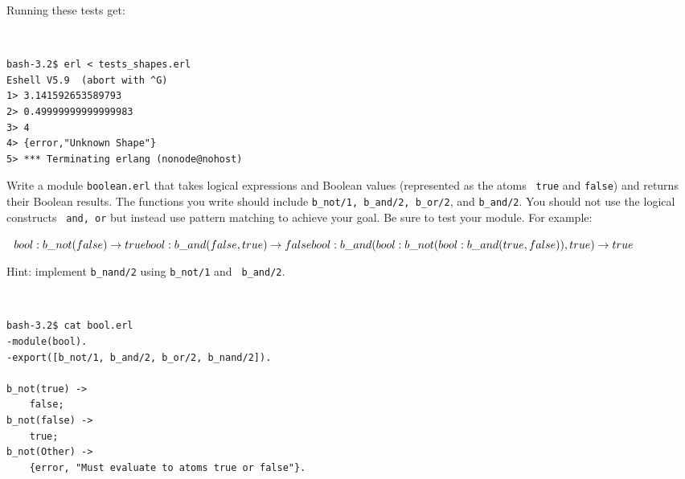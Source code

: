 \begin{questions}
\begin{solution}
    Running these tests get:
{\tt
\begin{verbatim}                                                                  
bash-3.2$ erl < tests_shapes.erl                                                  
Eshell V5.9  (abort with ^G)                                                      
1> 3.141592653589793                                                              
2> 0.49999999999999983                                                            
3> 4                                                                              
4> {error,"Unknown Shape"}                                                        
5> *** Terminating erlang (nonode@nohost)                                         
\end{verbatim}
}
    \end{solution}

    \question[15] Write a module {\tt boolean.erl} that takes logical
    expressions and Boolean values (represented as the atoms {\tt
    true} and {\tt false}) and returns their Boolean results. The
    functions you write should include {\tt b\_not/1, b\_and/2, b\_or/2},
    and {\tt b\_and/2}. You should not use the logical constructs {\tt
    and, or} but instead use pattern matching to achieve your goal. Be
    sure to test your module. For example:

    {\tt
    $bool:b\_not(false) \to true \\                                               
    bool:b\_and(false, true) \to false \\                                         
    bool:b\_and(bool:b\_not(bool:b\_and(true, false)), true) \to true \\          
    $}

    Hint: implement {\tt b\_nand/2} using {\tt b\_not/1} and {\tt
    b\_and/2}.

    \begin{solution}
    {\tt
\begin{verbatim}                                                                  
bash-3.2$ cat bool.erl                                                            
-module(bool).                                                                    
-export([b_not/1, b_and/2, b_or/2, b_nand/2]).                                    
                                                                                  
b_not(true) ->                                                                    
    false;                                                                        
b_not(false) ->                                                                   
    true;                                                                         
b_not(Other) ->                                                                   
    {error, "Must evaluate to atoms true or false"}.                              
                                                                                  

\end{verbatim}}
\end{solution}
\end{questions}
